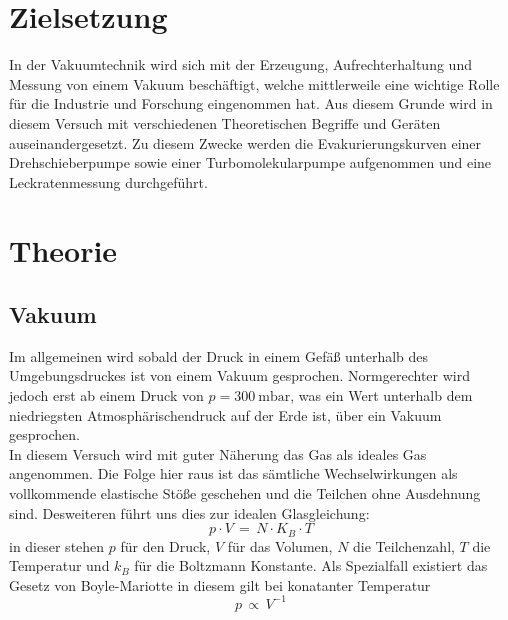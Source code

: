 \section{Zielsetzung}
In der Vakuumtechnik wird sich mit der Erzeugung, Aufrechterhaltung und Messung von einem Vakuum beschäftigt,
welche mittlerweile eine wichtige Rolle für die Industrie und Forschung eingenommen hat. Aus diesem Grunde wird
in diesem Versuch mit verschiedenen Theoretischen Begriffe und Geräten auseinandergesetzt. Zu diesem Zwecke werden
die Evakurierungskurven einer Drehschieberpumpe sowie einer Turbomolekularpumpe aufgenommen und eine Leckratenmessung 
durchgeführt.

\section{Theorie}
\label{sec:Theorie}

\subsection{Vakuum}
\label{sec:vakuumtheo}

Im allgemeinen wird sobald der Druck in einem Gefäß unterhalb des Umgebungsdruckes ist von einem Vakuum gesprochen. Normgerechter 
wird jedoch erst ab einem Druck von $p=\SI{300}{\milli\bar}$, was ein Wert unterhalb dem niedriegsten Atmosphärischendruck auf der 
Erde ist, über ein Vakuum gesprochen.\\
In diesem Versuch wird mit guter Näherung das Gas als ideales Gas angenommen. Die Folge hier raus ist das sämtliche Wechselwirkungen 
als vollkommende elastische Stöße geschehen und die Teilchen ohne Ausdehnung sind. Desweiteren führt uns dies zur idealen Glasgleichung:
\begin {equation}
 p\cdot V\,=\, N\cdot K_B\cdot T
\label{eqn:idealgas}
\end{equation}
in dieser stehen $p$ für den Druck, $V$ für das Volumen, $N$ die Teilchenzahl, $T$ die Temperatur und $k_B$ für die Boltzmann Konstante. 
Als Spezialfall existiert das Gesetz von Boyle-Mariotte in diesem gilt bei konatanter Temperatur 
\begin {equation*}
 p\,\propto \, V^{-1}
\end{equation*}